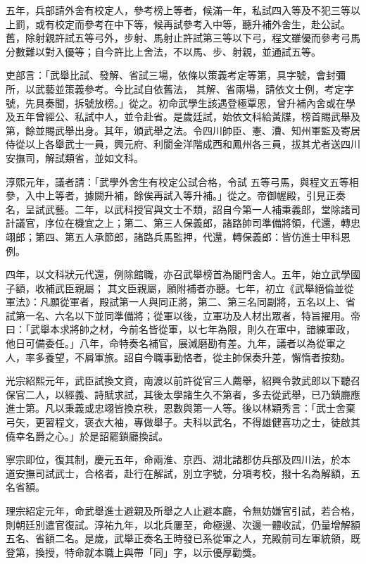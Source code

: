 \begin{pinyinscope}
 五年，兵部請外舍有校定人，參考榜上等者，候滿一年，私試四入等及不犯三等以上罰，或有校定而參考在中下等，候再試參考入中等，聽升補外舍生，赴公試。舊，除射親許試五等弓外，步射、馬射止許試第三等以下弓，程文雖優而參考弓馬分數難以對入優等；自今許比上舍法，不以馬、步、射親，並通試五等。



 吏部言：「武舉比試、發解、省試三場，依條以策義考定等第，具字號，會封彌所，以武藝並策義參考。今比試自依舊法，
 其解、省兩場，請依文士例，考定字號，先具奏聞，拆號放榜。」從之。初命武學生該遇登極覃恩，曾升補內舍或在學及五年曾經公、私試中人，並令赴省。是歲廷試，始依文科給黃牒，榜首賜武舉及第，餘並賜武舉出身。其年，頒武舉之法。令四川帥臣、憲、漕、知州軍監及寄居侍從以上各舉武士一員，興元府、利閬金洋階成西和鳳州各三員，拔其尤者送四川安撫司，解試類省，並如文科。



 淳熙元年，議者請：「武學外舍生有校定公試合格，令試
 五等弓馬，與程文五等相參，入中上等者，據闕升補，餘俟再試入等升補。」從之。帝御幄殿，引見正奏名，呈試武藝。二年，以武科授官與文士不類，詔自今第一人補秉義郎，堂除諸司計議官，序位在機宜之上；第二、第三人保義郎，諸路帥司準備將領，代還，轉忠翊郎；第四、第五人承節郎，諸路兵馬監押，代還，轉保義郎：皆仿進士甲科恩例。



 四年，以文科狀元代還，例除館職，亦召武舉榜首為閣門舍人。五年，始立武學國子額，收補武臣親屬；
 其文臣親屬，願附補者亦聽。七年，初立《武舉絕倫並從軍法》：凡願從軍者，殿試第一人與同正將，第二、第三名同副將，五名以上、省試第一名、六名以下並同準備將；從軍以後，立軍功及人材出眾者，特旨擢用。帝曰：「武舉本求將帥之材，今前名皆從軍，以七年為限，則久在軍中，諳練軍政，他日可備委任。」八年，命特奏名補官，展減磨勘有差。九年，議者以為從軍之人，率多養望，不屑軍旅。詔自今職事勤恪者，從主帥保奏升差，懈惰者按劾。



 光宗紹熙元年，武臣試換文資，南渡以前許從官三人薦舉，紹興令敦武郎以下聽召保官二人，以經義、詩賦求試，其後太學諸生久不第者，多去從武舉，已乃鎖廳應進士第。凡以秉義或忠翊皆換京秩，恩數與第一人等。後以林穎秀言：「武士舍棄弓矢，更習程文，褒衣大袖，專做舉子。夫科以武名，不得雄健喜功之士，徒啟其僥幸名爵之心。」於是詔罷鎖廳換試。



 寧宗即位，復其制，慶元五年，命兩淮、京西、湖北諸郡仿兵部及四川法，於本
 道安撫司試武士，合格者，赴行在解試，別立字號，分項考校，撥十名為解額，五名省額。



 理宗紹定元年，命武舉進士避親及所舉之人止避本廳，令無妨嫌官引試，若合格，則朝廷別遣官復試。淳祐九年，以北兵屢至，命極邊、次邊一體收試，仍量增解額五名、省額二名。是歲，武舉正奏名王時發已系從軍之人，充殿前司左軍統領，既登第，換授，特命就本職上與帶「同」字，以示優厚勸獎。




\end{pinyinscope}
